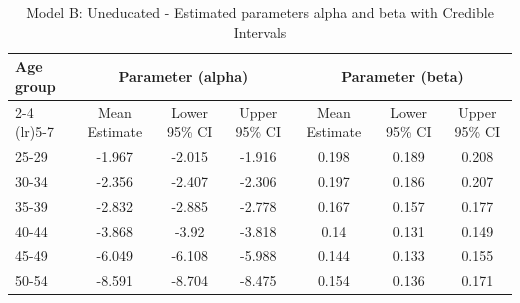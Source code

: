 \begin{landscape}
\begin{table}[htbp]
\centering
\caption{Model B: Uneducated - Estimated parameters alpha and beta  with Credible Intervals}
\label{tab:Fparameters_ab5}
\begin{tabular}{@{}lcccccc@{}}
\toprule
Age group & \multicolumn{3}{c}{Parameter (alpha)} & \multicolumn{3}{c}{Parameter (beta)} \\ 
\cmidrule(lr){2-4} \cmidrule(lr){5-7}
          & Mean Estimate & Lower 95\% CI & Upper 95\% CI & Mean Estimate & Lower 95\% CI & Upper 95\% CI \\ 
\midrule
25-29 & -1.967 & -2.015 & -1.916 & 0.198 & 0.189 & 0.208 \\
30-34 & -2.356 & -2.407 & -2.306 & 0.197 & 0.186 & 0.207 \\
35-39 & -2.832 & -2.885 & -2.778 & 0.167 & 0.157 & 0.177 \\
40-44 & -3.868 & -3.92 & -3.818 & 0.14 & 0.131 & 0.149 \\
45-49 & -6.049 & -6.108 & -5.988 & 0.144 & 0.133 & 0.155 \\
50-54 & -8.591 & -8.704 & -8.475 & 0.154 & 0.136 & 0.171 \\
\bottomrule
\end{tabular}
\end{table}
\end{landscape}